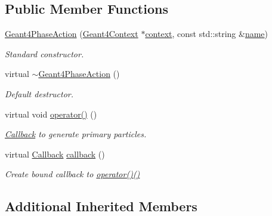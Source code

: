 \subsection*{Public Member Functions}
\begin{DoxyCompactItemize}
\item 
\hyperlink{class_d_d4hep_1_1_simulation_1_1_geant4_phase_action_ad15d56cd51ec30099dea4db3ab92ae52}{Geant4\+Phase\+Action} (\hyperlink{class_d_d4hep_1_1_simulation_1_1_geant4_context}{Geant4\+Context} $\ast$\hyperlink{class_d_d4hep_1_1_simulation_1_1_geant4_action_aa9d87f0ec2a72b7fc2591b18f98d75cf}{context}, const std\+::string \&\hyperlink{class_d_d4hep_1_1_simulation_1_1_geant4_action_af374e70b014d16afb81dd9d77cc3894b}{name})
\begin{DoxyCompactList}\small\item\em Standard constructor. \end{DoxyCompactList}\item 
virtual \hyperlink{class_d_d4hep_1_1_simulation_1_1_geant4_phase_action_aba4b3737a47e5f9aa71ee76c1292bfdd}{$\sim$\+Geant4\+Phase\+Action} ()
\begin{DoxyCompactList}\small\item\em Default destructor. \end{DoxyCompactList}\item 
virtual void \hyperlink{class_d_d4hep_1_1_simulation_1_1_geant4_phase_action_a5d8bac662ec707a8cdff0bd3cdd9b831}{operator()} ()
\begin{DoxyCompactList}\small\item\em \hyperlink{class_d_d4hep_1_1_callback}{Callback} to generate primary particles. \end{DoxyCompactList}\item 
virtual \hyperlink{class_d_d4hep_1_1_callback}{Callback} \hyperlink{class_d_d4hep_1_1_simulation_1_1_geant4_phase_action_a2ec5c793439611a45e83c2fffd5093d2}{callback} ()
\begin{DoxyCompactList}\small\item\em Create bound callback to \hyperlink{class_d_d4hep_1_1_simulation_1_1_geant4_phase_action_a5d8bac662ec707a8cdff0bd3cdd9b831}{operator()()} \end{DoxyCompactList}\end{DoxyCompactItemize}
\subsection*{Additional Inherited Members}


